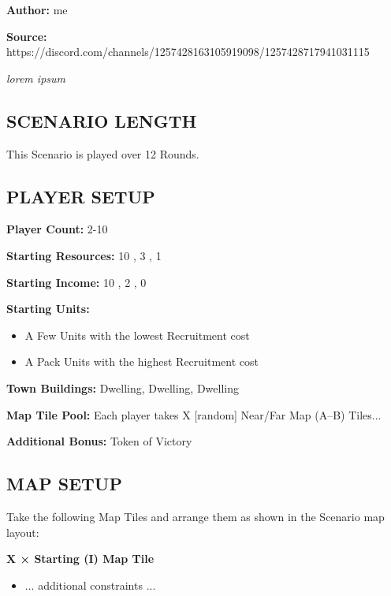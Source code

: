 
\begin{multicols*}{2}

\textbf{Author:} me

\textbf{Source:} https://discord.com/channels/1257428163105919098/1257428717941031115

\textit{lorem ipsum}

\subsection*{\MakeUppercase{Scenario Length}}

This Scenario is played over 12 Rounds.

\subsection*{\MakeUppercase{Player Setup}}

\textbf{Player Count:} 2-10

\textbf{Starting Resources:} 10 , 3 , 1 

\textbf{Starting Income:} 10 , 2 , 0 

\textbf{Starting Units:}
\begin{itemize}
  \item A Few  Units with the lowest Recruitment cost
  \item A Pack  Units with the highest Recruitment cost
\end{itemize}

\textbf{Town Buildings:}  Dwelling,  Dwelling,  Dwelling

\textbf{Map Tile Pool:} Each player takes X [random] Near/Far Map (A--B) Tiles...

\textbf{Additional Bonus:} Token of Victory

\subsection*{\MakeUppercase{Map Setup}}

Take the following Map Tiles and arrange them as shown in the Scenario map layout:

\textbf{X × Starting (I) Map Tile}
\begin{itemize}
    \item ... additional constraints ...
\end{itemize}


\end{multicols*}
